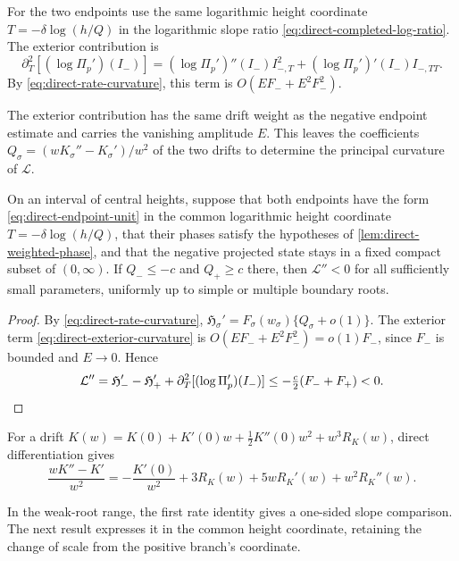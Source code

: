 For the two endpoints use the same logarithmic height coordinate
\(T=-\delta\log(h/Q)\) in the logarithmic slope ratio
\eqref{eq:direct-completed-log-ratio}.
The exterior contribution is
\begin{equation}
\label{eq:direct-exterior-curvature}
 \partial_T^2[(\log\Pi_p')(I_-)]
       =(\log\Pi_p')''(I_-)I_{-,T}^2+(\log\Pi_p')'(I_-)I_{-,TT}.
\end{equation}
By \eqref{eq:direct-rate-curvature}, this term is
\(O(EF_-+E^2F_-^2)\).

The exterior contribution has the same drift weight as the negative
endpoint estimate and carries the vanishing amplitude \(E\). This leaves
the coefficients \(Q_\sigma=(wK_\sigma''-K_\sigma')/w^2\) of the two
drifts to determine the principal curvature of \(\mathcal L\).

\begin{lemma}
\label{lem:curvature-criterion}
On an interval of central heights, suppose that both endpoints have the
form \eqref{eq:direct-endpoint-unit} in the common logarithmic height
coordinate \(T=-\delta\log(h/Q)\), that their phases satisfy the
hypotheses of \cref{lem:direct-weighted-phase}, and that the negative
projected state stays in a fixed compact subset of \((0,\infty)\). If
\(Q_-\le-c\) and \(Q_+\ge c\) there, then \(\mathcal L''<0\) for all
sufficiently small parameters, uniformly up to simple or multiple
boundary roots.
\end{lemma}

\begin{proof}
By \eqref{eq:direct-rate-curvature},
\(\mathfrak H_\sigma'=F_\sigma(w_\sigma)\{Q_\sigma+o(1)\}\). The exterior
term \eqref{eq:direct-exterior-curvature} is \(O(EF_-+E^2F_-^2)=o(1)F_-\),
since \(F_-\) is bounded and \(E\to0\). Hence
\[
 \mathcal L''=\mathfrak H_-'-\mathfrak H_+'+\partial_T^2[(\log\Pi_p')(I_-)]
 \le-\tfrac c2(F_-+F_+)<0.\qedhere
\]
\end{proof}

For a drift
\(K(w)=K(0)+K'(0)w+\tfrac12K''(0)w^2+w^3R_K(w)\), direct
differentiation gives
\begin{equation}
\label{eq:direct-curvature-coefficient-cubic}
 \frac{wK''-K'}{w^2}
 =-\frac{K'(0)}{w^2}+3R_K(w)+5wR_K'(w)+w^2R_K''(w).
\end{equation}

In the weak-root range, the first rate identity gives a one-sided slope
comparison. The next result expresses it in the common height coordinate,
retaining the change of scale from the positive branch's coordinate.

